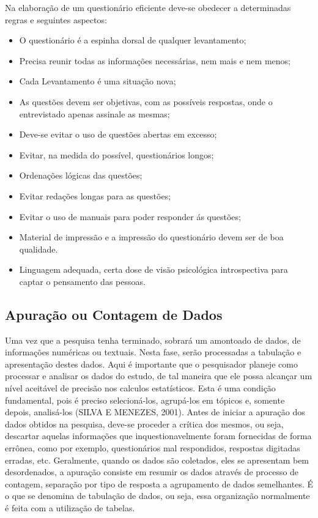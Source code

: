 


\inic Na elaboração de um questionário eficiente deve-se obedecer a determinadas regras e seguintes aspectos:

\begin{itemize}
\item O questionário é a espinha dorsal de qualquer levantamento;
\item Precisa reunir todas as informações necessárias, nem mais e nem menos;
\item Cada Levantamento é uma situação nova;
  \item As questões devem ser objetivas, com as possíveis respostas, onde o entrevistado apenas assinale as mesmas;
  \item Deve-se evitar o uso de questões abertas em excesso;
  \item Evitar, na medida do possível, questionários longos;
  \item Ordenações lógicas das questões;
  \item Evitar redações longas para as questões;
  \item Evitar o uso de manuais para poder responder ás questões;
  \item Material de impressão e a impressão do questionário devem ser de boa qualidade.
  \item Linguagem adequada, certa dose de visão psicológica introspectiva para captar o pensamento das pessoas.
\end{itemize}


\subsection{Apuração ou Contagem de Dados}

\inic Uma vez que a pesquisa tenha terminado, sobrará um amontoado de dados, de informações numéricas ou textuais. Nesta fase, serão
processadas a tabulação e apresentação destes dados. Aqui é
importante que o pesquisador planeje como processar e analisar os
dados do estudo, de tal maneira que ele possa alcançar um nível
aceitável de precisão nos calculos estatísticos. Esta é uma
condição fundamental, pois é preciso selecioná-los, agrupá-los em
tópicos e, somente depois, analisá-los (SILVA E MENEZES, 2001).
Antes de iniciar a apuração dos dados obtidos na pesquisa, deve-se
proceder a crítica dos mesmos, ou seja, descartar aquelas
informações que inquestionavelmente foram fornecidas de forma
errônea, como por exemplo, questionários mal respondidos,
respostas digitadas erradas, etc. Geralmente, quando os dados são
coletados, eles se apresentam bem desordenados, a apuração
consiste em resumir os dados através de processo de contagem,
separação por tipo de resposta a agrupamento de dados semelhantes.
É o que se denomina de tabulação de dados, ou seja, essa
organização normalmente é feita com a utilização de tabelas.\vskip0.3cm


